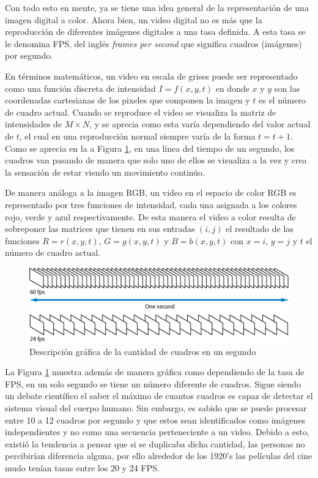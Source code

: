 Con todo esto en mente, ya se tiene una idea general de la representación de una imagen digital a color. Ahora bien, un video digital no es más que la reproducción de diferentes imágenes digitales a una tasa definida. A esta tasa se le denomina FPS, del inglés \emph{frames per second} que significa cuadros (imágenes) por segundo.

En términos matemáticos, un video en escala de grises puede ser representado como una función discreta de intensidad $I = f(x,y,t)$ en donde $x$ y $y$ son las coordenadas cartesianas de los pixeles que componen la imagen y $t$ es el número de cuadro actual. Cuando se reproduce el video se visualiza la matriz de intensidades de $M \times N$, y se aprecia como esta varía dependiendo del valor actual de $t$, el cual en una reproducción normal siempre varía de la forma $t = t+1$. Como se aprecia en la a Figura \ref{fig:frames}, en una línea del tiempo de un segundo, los cuadros van pasando de manera que solo uno de ellos se visualiza a la vez y crea la sensación de estar viendo un movimiento continúo. 

De manera análoga a la imagen RGB, un video en el espacio de color RGB es representado por tres funciones de intensidad, cada una asignada a los colores rojo, verde y azul respectivamente. De esta manera el video a color resulta de sobreponer las matrices que tienen en sus entradas $(i,j)$ el resultado de las funciones $R = r(x,y,t)$, $G = g(x,y,t)$ y $B = b(x,y,t)$ con $x=i$, $y = j$ y $t$ el número de cuadro actual.

\begin{figure}
	\includegraphics[width=\linewidth]{images/frames}
	\caption{Descripción gráfica de la cantidad de cuadros en un segundo} \label{fig:frames}
\end{figure}

La Figura \ref{fig:frames} muestra además de manera gráfica como dependiendo de la tasa de FPS, en un solo segundo se tiene un número diferente de cuadros. Sigue siendo un debate científico el saber el máximo de cuantos cuadros es capaz de detectar el sistema visual del cuerpo humano. Sin embargo, es sabido que se puede procesar entre 10 a 12 cuadros por segundo y que estos sean identificados como imágenes independientes y no como una secuencia perteneciente a un video. Debido a esto, existió la tendencia a pensar que si se duplicaba dicha cantidad, las personas no percibirían diferencia alguna, por ello alrededor de los 1920's las películas del cine mudo tenían tasas entre los 20 y 24 FPS.

